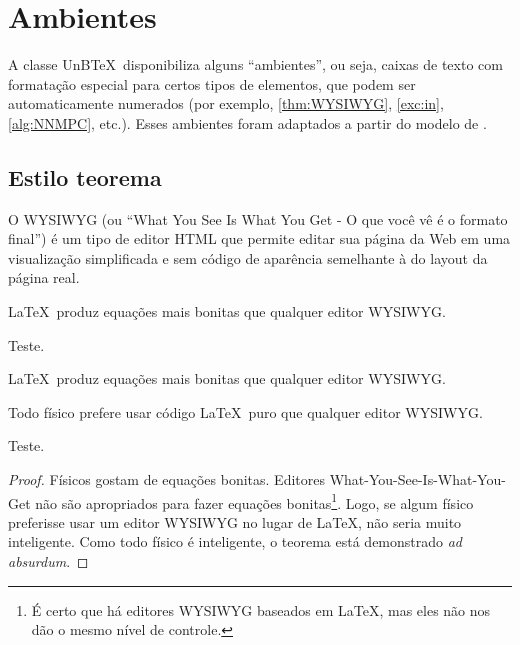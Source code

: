 \chapter{Ambientes}

A classe UnB\TeX\ disponibiliza alguns ``ambientes'', ou seja, caixas de texto com formatação especial para certos tipos de elementos, que podem ser automaticamente numerados (por exemplo, \cref{thm:WYSIWYG}, \cref{exc:in}, \cref{alg:NNMPC}, etc.). Esses ambientes foram adaptados a partir do modelo de .

\section{Estilo teorema}

\begin{definition}
O WYSIWYG (ou ``What You See Is What You Get - O que você vê é o formato final'') é um tipo de editor HTML que permite editar sua página da Web em uma visualização simplificada e sem código de aparência semelhante à do layout da página real.
\end{definition}

\begin{proposition}\label{prop:WYSIWYG}
    \LaTeX\ produz equações mais bonitas que qualquer editor WYSIWYG.
\end{proposition}

\begin{lemma}
    Teste.
\end{lemma}

\begin{remark}
    \LaTeX\ produz equações mais bonitas que qualquer editor WYSIWYG.
\end{remark}

\begin{theorem}\label{thm:WYSIWYG}
    Todo físico prefere usar código \LaTeX\ puro que qualquer editor WYSIWYG.
\end{theorem}

\begin{corollary}
    Teste.
\end{corollary}

\begin{proof}
    Físicos gostam de equações bonitas. Editores What-You-See-Is-What-You-Get não são apropriados para fazer equações bonitas\footnote{É certo que há editores WYSIWYG baseados em \LaTeX, mas eles não nos dão o mesmo nível de controle.}. Logo, se algum físico preferisse usar um editor WYSIWYG no lugar de \LaTeX, não seria muito inteligente. Como todo físico é inteligente, o teorema está demonstrado \textit{ad absurdum}.
\end{proof}

